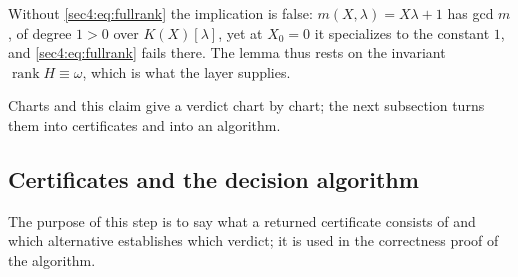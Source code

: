 \documentclass[journal]{IEEEtran}
\theoremstyle{plainn}
\theoremstyle{remark}
\newcommand{\rank}{\operatorname{rank}}
\begin{document}
Without \eqref{sec4:eq:fullrank} the implication is false: $m(X,\lambda)=X\lambda+1$ has gcd $m$, of
degree $1>0$ over $K(X)[\lambda]$, yet at $X_0=0$ it specializes to the constant $1$, and
\eqref{sec4:eq:fullrank} fails there. The lemma thus rests on the invariant $\rank H\equiv\omega$,
which is what the layer supplies.


Charts and this claim give a verdict chart by chart; the next subsection turns them into certificates
and into an algorithm.


\subsection{Certificates and the decision algorithm}\label{sec4:real}\label{sec4:certificates}\label{sec4:algorithm}


The purpose of this step is to say what a returned certificate consists of and which alternative
establishes which verdict; it is used in the correctness proof of the algorithm.
\end{document}
